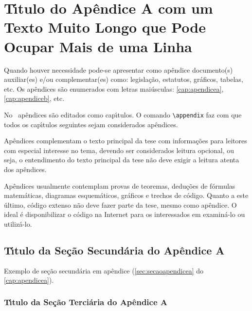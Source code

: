 
\chapter{T\'{\i}tulo do Ap\^endice A com um Texto Muito Longo que Pode Ocupar Mais de uma Linha}\label{cap:apendicea}

Quando houver necessidade pode-se apresentar como ap\^endice documento(s) auxiliar(es) e/ou complementar(es) como: legisla\c{c}\~ao, estatutos, gr\'aficos, tabelas, etc. Os ap\^endices s\~ao enumerados com letras mai\'usculas: \autoref{cap:apendicea}, \autoref{cap:apendiceb}, etc.

No \latex\ ap\^endices s\~ao editados como cap\'{\i}tulos. O comando \verb|\appendix| faz com que todos os cap\'{\i}tulos seguintes sejam considerados ap\^endices.

Ap\^endices complementam o texto principal da tese com informa\c{c}\~oes para leitores com especial interesse no tema, devendo ser considerados leitura opcional, ou seja, o entendimento do texto principal da tese n\~ao deve exigir a leitura atenta dos ap\^endices.

Ap\^endices usualmente contemplam provas de teoremas, dedu\c{c}\~oes de f\'ormulas matem\'aticas, diagramas esquem\'aticos, gr\'aficos e trechos de c\'odigo. Quanto a este \'ultimo, c\'odigo extenso n\~ao deve fazer parte da tese, mesmo como ap\^endice. O ideal \'e disponibilizar o c\'odigo na Internet para os interessados em examin\'a-lo ou utiliz\'a-lo.

\section{T\'{\i}tulo da Se\c{c}\~ao Secund\'aria do Ap\^endice A}\label{sec:secaoapendicea}

Exemplo de se\c{c}\~ao secund\'aria em ap\^endice (\autoref{sec:secaoapendicea} do \autoref{cap:apendicea}).

\subsection{T\'{\i}tulo da Se\c{c}\~ao Terci\'aria do Ap\^endice A}\label{subsec:subsecaoapendicea}

